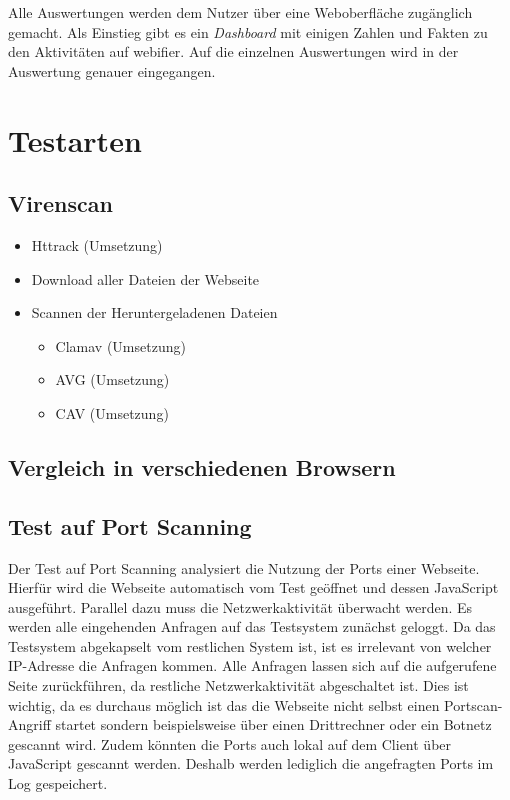 Alle Auswertungen werden dem Nutzer über eine Weboberfläche zugänglich gemacht. Als Einstieg gibt es ein \textit{Dashboard} mit einigen Zahlen und Fakten zu den Aktivitäten auf webifier. Auf die einzelnen Auswertungen wird in der Auswertung genauer eingegangen.

\section{Testarten}

\subsection{Virenscan}


\begin{itemize}
  \item Httrack (Umsetzung)
  \item Download aller Dateien der Webseite
  \item Scannen der Heruntergeladenen Dateien
  \begin{itemize}
    \item Clamav (Umsetzung)
    \item AVG (Umsetzung)
    \item CAV (Umsetzung)
  \end{itemize}
\end{itemize}

\subsection{Vergleich in verschiedenen Browsern}


\subsection{Test auf Port Scanning}
Der Test auf Port Scanning analysiert die Nutzung der Ports einer Webseite. Hierfür wird die Webseite automatisch vom Test geöffnet und dessen JavaScript ausgeführt. Parallel dazu muss die Netzwerkaktivität überwacht werden. Es werden alle eingehenden Anfragen auf das Testsystem zunächst geloggt. Da das Testsystem abgekapselt vom restlichen System ist, ist es irrelevant von welcher IP-Adresse die Anfragen kommen. Alle Anfragen lassen sich auf die aufgerufene Seite zurückführen, da restliche Netzwerkaktivität abgeschaltet ist. Dies ist wichtig, da es durchaus möglich ist das die Webseite nicht selbst einen Portscan-Angriff startet sondern beispielsweise über einen Drittrechner oder ein Botnetz gescannt wird. Zudem könnten die Ports auch lokal auf dem Client über JavaScript gescannt werden. Deshalb werden lediglich die angefragten Ports im Log gespeichert.

